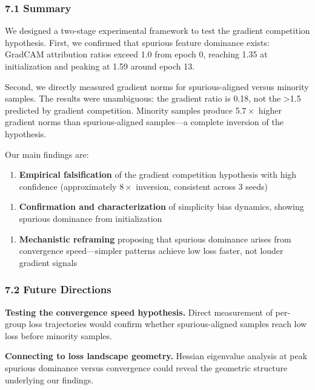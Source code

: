 
\subsubsection{7.1 Summary}

We designed a two-stage experimental framework to test the gradient competition hypothesis. First, we confirmed that spurious feature dominance exists: GradCAM attribution ratios exceed 1.0 from epoch 0, reaching 1.35 at initialization and peaking at 1.59 around epoch 13.

Second, we directly measured gradient norms for spurious-aligned versus minority samples. The results were unambiguous: the gradient ratio is 0.18, not the >1.5 predicted by gradient competition. Minority samples produce 5.$7\times$ higher gradient norms than spurious-aligned samples---a complete inversion of the hypothesis.

Our main findings are:

\begin{enumerate}
\item \textbf{Empirical falsification} of the gradient competition hypothesis with high confidence (approximately $8\times$ inversion, consistent across 3 seeds)
\end{enumerate}

\begin{enumerate}
\item \textbf{Confirmation and characterization} of simplicity bias dynamics, showing spurious dominance from initialization
\end{enumerate}

\begin{enumerate}
\item \textbf{Mechanistic reframing} proposing that spurious dominance arises from convergence speed---simpler patterns achieve low loss faster, not louder gradient signals
\end{enumerate}

\subsubsection{7.2 Future Directions}

\textbf{Testing the convergence speed hypothesis.} Direct measurement of per-group loss trajectories would confirm whether spurious-aligned samples reach low loss before minority samples.

\textbf{Connecting to loss landscape geometry.} Hessian eigenvalue analysis at peak spurious dominance versus convergence could reveal the geometric structure underlying our findings.

